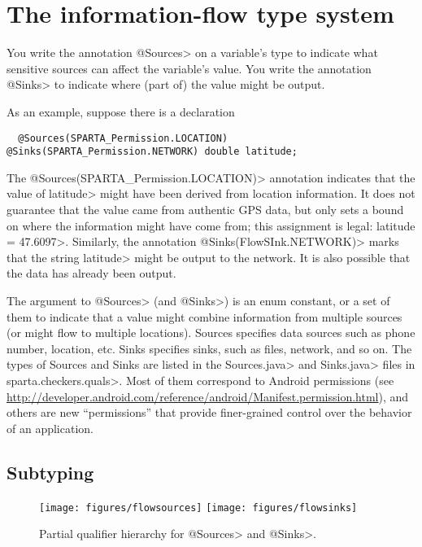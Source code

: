 \section{The information-flow type system\label{sec:flow-type-system}}

You write the annotation \<@Sources> on a variable's
type to indicate what sensitive sources can affect the variable's value.
You write the annotation \<@Sinks> to indicate where (part of) the
value might be output.

As an example, suppose there is a declaration
\begin{Verbatim}
  @Sources(SPARTA_Permission.LOCATION) @Sinks(SPARTA_Permission.NETWORK) double latitude;
\end{Verbatim}
\noindent
The \<@Sources(SPARTA_Permission.LOCATION)> annotation indicates that the
value of \<latitude> might have been derived from
location information.  It does not guarantee that the value came from
authentic GPS data, but only sets a bound on where the information might
have come from; this assignment is legal: \<latitude = 47.6097>.
Similarly, the annotation \<@Sinks(FlowSInk.NETWORK)> marks that
the string \<latitude> might be output to the network.  It is also
possible that the data has already been output.

The argument to \<@Sources> (and \<@Sinks>) is an enum constant, or a
set of them to indicate that a value might combine information from
multiple sources (or might flow to multiple locations).
Sources specifies data sources such as phone number, location, 
etc.  Sinks specifies sinks, such as files, network, and so on.
The types of Sources and Sinks are listed in the
\<Sources.java> and \<Sinks.java> files in \<sparta.checkers.quals>.
Most of them correspond to Android permissions (see 
\url{http://developer.android.com/reference/android/Manifest.permission.html}),
and others are new ``permissions'' that provide finer-grained control over
the behavior of an application.


\subsection{Subtyping\label{sec:subtyping}}

\begin{figure}
\centerline{\texttt{[image: figures/flowsources]}%
  \hfill%
  \texttt{[image: figures/flowsinks]}}
\caption{Partial qualifier hierarchy for \<@Sources> and \<@Sinks>.}
\label{fig:flow-hierarchy}
\end{figure}

